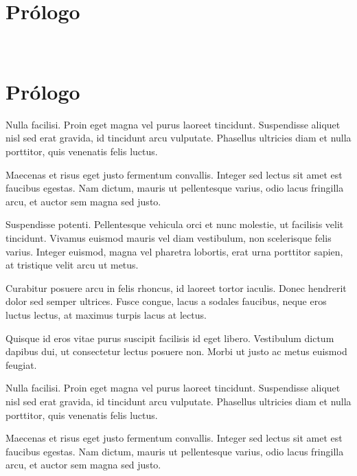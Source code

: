 \ifPDF
\chapter[\hspace{1.5pc}Prólogo]{Prólogo}
\setcounter{PrimPag}{\theCurrentPage}

\begin{center}
	\\
	\vspace{20mm}
\end{center}
	\else
	\ifHTMLEPUB
	\chapter{Prólogo}
	\fi
\fi

Nulla facilisi. Proin eget magna vel purus laoreet tincidunt. Suspendisse aliquet nisl sed erat gravida, id tincidunt arcu vulputate. Phasellus ultricies diam et nulla porttitor, quis venenatis felis luctus.

Maecenas et risus eget justo fermentum convallis. Integer sed lectus sit amet est faucibus egestas. Nam dictum, mauris ut pellentesque varius, odio lacus fringilla arcu, et auctor sem magna sed justo.

Suspendisse potenti. Pellentesque vehicula orci et nunc molestie, ut facilisis velit tincidunt. Vivamus euismod mauris vel diam vestibulum, non scelerisque felis varius. Integer euismod, magna vel pharetra lobortis, erat urna porttitor sapien, at tristique velit arcu ut metus.

Curabitur posuere arcu in felis rhoncus, id laoreet tortor iaculis. Donec hendrerit dolor sed semper ultrices. Fusce congue, lacus a sodales faucibus, neque eros luctus lectus, at maximus turpis lacus at lectus.

Quisque id eros vitae purus suscipit facilisis id eget libero. Vestibulum dictum dapibus dui, ut consectetur lectus posuere non. Morbi ut justo ac metus euismod feugiat.

Nulla facilisi. Proin eget magna vel purus laoreet tincidunt. Suspendisse aliquet nisl sed erat gravida, id tincidunt arcu vulputate. Phasellus ultricies diam et nulla porttitor, quis venenatis felis luctus.

Maecenas et risus eget justo fermentum convallis. Integer sed lectus sit amet est faucibus egestas. Nam dictum, mauris ut pellentesque varius, odio lacus fringilla arcu, et auctor sem magna sed justo.

